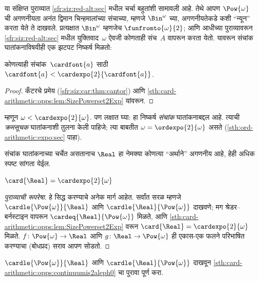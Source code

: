 या संक्षिप्त पुराव्यात \ref{sfr:siz:red-alt:sec} मधील चर्चा बहुतांशी सामावली आहे. तेथे आपण $\Pow{\omega}$ ची अगणनीयता अनंत द्विमान चिन्हमालांच्या संचाच्या, म्हणजे $\Bin^\omega$ च्या, अगणनीयतेकडे कशी “न्यून” करता येते ते दाखवले. प्रत्यक्षात $\Bin^{\omega}$ म्हणजेच $\funfromto{\omega}{2}$; आणि आधीच्या पुराव्यावरून \ref{sfr:siz:red-alt:sec} मधील युक्तिवाद~$\omega$ ऐवजी कोणताही संच~$A$ वापरून करता येतो. यावरून संचांक घातांकनाविषयीही एक झटपट निष्कर्ष मिळतो:

\begin{cor}\label{sth:card-arithmetic:opps:cantorcor}
कोणत्याही संचांक~$\cardfont{a}$ साठी $\cardfont{a} < \cardexpo{2}{\cardfont{a}}$.
\end{cor}

\begin{proof}
कँटरचे प्रमेय (\ref{sfr:siz:car:thm:cantor}) आणि
\ref{sth:card-arithmetic:opps:lem:SizePowerset2Exp} यांवरून.
\end{proof}
\noindent
म्हणून $\omega < \cardexpo{2}{\omega}$. पण लक्षात घ्या: हा निष्कर्ष \emph{संचांक} घातांकनाबद्दल आहे. त्याची \emph{क्रमसूचक} घातांकनाशी तुलना केली पाहिजे; त्या बाबतीत $\omega =
\ordexpo{2}{\omega}$ असते (\ref{sth:ord-arithmetic:expo:sec} पाहा).

संचांक घातांकनाच्या चर्चेत असतानाच $\Real$ हा नेमक्या कोणत्या “अर्थाने” अगणनीय आहे, हेही अधिक स्पष्ट सांगता येईल.

\begin{thm}\label{sth:card-arithmetic:opps:continuumis2aleph0}
$\card{\Real} = \cardexpo{2}{\omega}$
\end{thm}

\begin{proof}[पुराव्याची रूपरेषा]
हे सिद्ध करण्याचे अनेक मार्ग आहेत. सर्वांत सरळ म्हणजे $\cardle{\Pow{\omega}}{\Real}$ आणि
$\cardle{\Real}{\Pow{\omega}}$ दाखवणे; मग श्रेडर--बर्नस्टाइन वापरून
$\cardeq{\Real}{\Pow{\omega}}$ मिळते, आणि
\ref{sth:card-arithmetic:opps:lem:SizePowerset2Exp} वरून
$\card{\Real} = \cardexpo{2}{\omega}$ मिळते. $f \colon
\Pow{\omega} \to \Real$ आणि $g \colon \Real \to \Pow{\omega}$ ही एकास-एक फलने परिभाषित करण्याचा (बोधप्रद) सराव आपण सोडतो.
\end{proof}

\begin{prob}
$\cardle{\Pow{\omega}}{\Real}$ आणि
$\cardle{\Real}{\Pow{\omega}}$ दाखवून \ref{sth:card-arithmetic:opps:continuumis2aleph0} चा पुरावा पूर्ण करा.
\end{prob}







